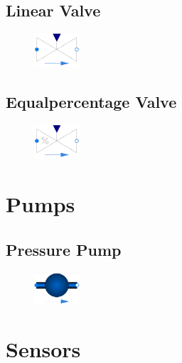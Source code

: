\documentclass[we,final,11pt,oneside,openany]{uantwerpenbamathesis}
\begin{document}
\subsection{Linear Valve}
\label{subsec:linear-valve}

\begin{figure}
    \centering
    \includegraphics[width=0.15\textwidth]{Images/components/linear-valve}
\end{figure}

\lipsum[67]

\subsection{Equalpercentage Valve}
\label{subsec:equalpercentage-valve}

\begin{figure}
    \centering
    \includegraphics[width=0.15\textwidth]{Images/components/equi-valve}
\end{figure}

\lipsum[67]

\section{Pumps}
\label{sec:pumps}

\subsection{Pressure Pump}
\label{subsec:pressure-pump}

\begin{figure}
    \centering
    \includegraphics[width=0.15\textwidth]{Images/components/pressure-pump}
\end{figure}

\lipsum[67]

\section{Sensors}
\label{sec:sensors}
\end{document}
